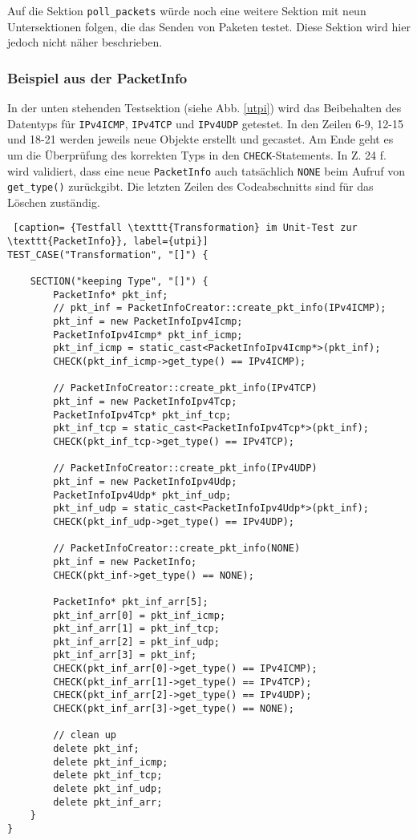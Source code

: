 \documentclass[../review_3.tex]{subfiles}
\begin{document}
Auf die Sektion \texttt{poll\_packets} würde noch eine weitere Sektion mit neun Untersektionen folgen, die das Senden von Paketen testet. Diese Sektion wird hier jedoch nicht näher beschrieben.

\subsubsection{Beispiel aus der PacketInfo}

In der unten stehenden Testsektion (siehe Abb. \ref{utpi}) wird das Beibehalten des Datentyps für \texttt{IPv4ICMP}, \texttt{IPv4TCP} und \texttt{IPv4UDP} getestet. In den Zeilen 6-9, 12-15 und 18-21 werden jeweils neue Objekte erstellt und gecastet. Am Ende geht es um die Überprüfung des korrekten Typs in den \texttt{CHECK}-Statements. In Z. 24 f. wird validiert, dass eine neue \texttt{PacketInfo} auch tatsächlich \texttt{NONE} beim Aufruf von \texttt{get\_type()} zurückgibt. Die letzten Zeilen des Codeabschnitts sind für das Löschen zuständig.

\begin{lstlisting} [caption= {Testfall \texttt{Transformation} im Unit-Test zur \texttt{PacketInfo}}, label={utpi}]
TEST_CASE("Transformation", "[]") {
    
    SECTION("keeping Type", "[]") {
        PacketInfo* pkt_inf;
        // pkt_inf = PacketInfoCreator::create_pkt_info(IPv4ICMP);
        pkt_inf = new PacketInfoIpv4Icmp;
        PacketInfoIpv4Icmp* pkt_inf_icmp;
        pkt_inf_icmp = static_cast<PacketInfoIpv4Icmp*>(pkt_inf);
        CHECK(pkt_inf_icmp->get_type() == IPv4ICMP);
        
        // PacketInfoCreator::create_pkt_info(IPv4TCP)
        pkt_inf = new PacketInfoIpv4Tcp;
        PacketInfoIpv4Tcp* pkt_inf_tcp;
        pkt_inf_tcp = static_cast<PacketInfoIpv4Tcp*>(pkt_inf);
        CHECK(pkt_inf_tcp->get_type() == IPv4TCP);
        
        // PacketInfoCreator::create_pkt_info(IPv4UDP)
        pkt_inf = new PacketInfoIpv4Udp;
        PacketInfoIpv4Udp* pkt_inf_udp;
        pkt_inf_udp = static_cast<PacketInfoIpv4Udp*>(pkt_inf);
        CHECK(pkt_inf_udp->get_type() == IPv4UDP);
        
        // PacketInfoCreator::create_pkt_info(NONE)
        pkt_inf = new PacketInfo;
        CHECK(pkt_inf->get_type() == NONE);
        
        PacketInfo* pkt_inf_arr[5];
        pkt_inf_arr[0] = pkt_inf_icmp;
        pkt_inf_arr[1] = pkt_inf_tcp;
        pkt_inf_arr[2] = pkt_inf_udp;
        pkt_inf_arr[3] = pkt_inf;
        CHECK(pkt_inf_arr[0]->get_type() == IPv4ICMP);
        CHECK(pkt_inf_arr[1]->get_type() == IPv4TCP);
        CHECK(pkt_inf_arr[2]->get_type() == IPv4UDP);
        CHECK(pkt_inf_arr[3]->get_type() == NONE);
        
        // clean up
        delete pkt_inf;
        delete pkt_inf_icmp;
        delete pkt_inf_tcp;
        delete pkt_inf_udp;
        delete pkt_inf_arr;
    }
}\end{lstlisting}
\end{document}
